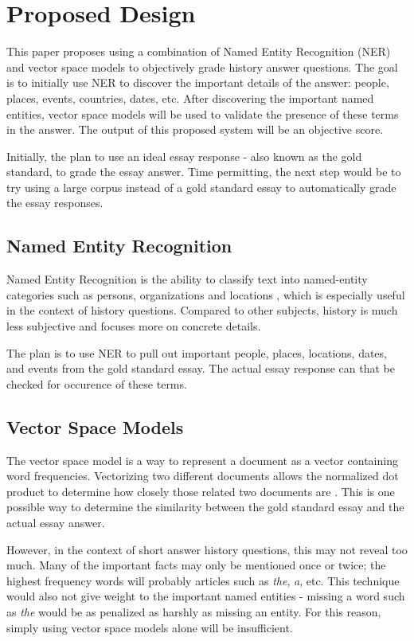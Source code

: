 \section{Proposed Design}
\label{section:propeseddesign}
This paper proposes using a combination of Named Entity Recognition (NER) and vector space models to objectively grade history answer questions. The goal is to initially use NER to discover the important details of the answer: people, places, events, countries, dates, etc. After discovering the important named entities, vector space models will be used to validate the presence of these terms in the answer. The output of this proposed system will be an objective score.

Initially, the plan to use an ideal essay response - also known as the gold standard, to grade the essay answer. Time permitting, the next step would be to try using a large corpus instead of a gold standard essay to automatically grade the essay responses.

\subsection{Named Entity Recognition}
 Named Entity Recognition is the ability to classify text into named-entity categories such as persons, organizations and locations \cite{recognizing_named_entities_in_tweets}, which is especially useful in the context of history questions. Compared to other subjects, history is much less subjective and focuses more on concrete details.

 The plan is to use NER to pull out important people, places, locations, dates, and events from the gold standard essay. The actual essay response can that be checked for occurence of these terms.

 \subsection{Vector Space Models}
The vector space model is a way to represent a document as a vector containing word frequencies. Vectorizing two different documents allows the normalized dot product to determine how closely those related two documents are \cite{the_book}. This is one possible way to determine the similarity between the gold standard essay and the actual essay answer.

However, in the context of short answer history questions, this may not reveal too much. Many of the important facts may only be mentioned once or twice; the highest frequency words will probably articles such as \textit{the}, \textit{a}, etc. This technique would also not give weight to the important named entities - missing a word such as \textit{the} would be as penalized as harshly as missing an entity. For this reason, simply using vector space models alone will be insufficient.


